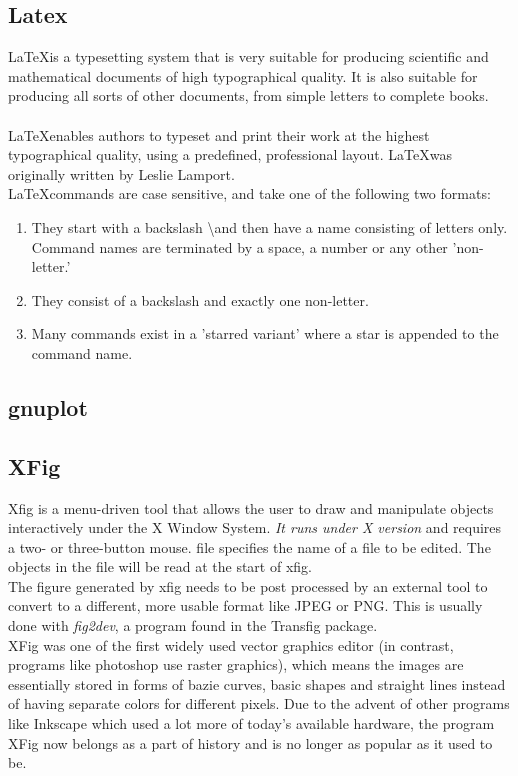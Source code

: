 \documentclass{beamer}
\begin{document}
\begin{frame}
	\section{Latex}
	\LaTeX is a typesetting system that is very suitable for producing scientific and mathematical documents of high typographical quality. It is also suitable for producing all sorts of other documents, from simple letters to complete books.\\
	\\
	\LaTeX enables authors to typeset and print their work at the highest typographical quality, using a predefined, professional layout. \LaTeX was originally written by Leslie Lamport.\\
	
	\LaTeX commands are case sensitive, and take one of the following two formats:
	\begin{enumerate}
		\item They start with a backslash \textbackslash and then have a name consisting of
		letters only. Command names are terminated by a space, a number or
		any other 'non-letter.'
		\item They consist of a backslash and exactly one non-letter.
		\item Many commands exist in a 'starred variant' where a star is appended
		to the command name.
	\end{enumerate}
\end{frame}
\begin{frame}
\section{gnuplot}
\end{frame}
\begin{frame}
\section{XFig}
Xfig  is a menu-driven tool that allows the user to draw and manipulate
objects interactively under the X Window System.  \emph{ It runs under X
version  } and requires a two- or three-button mouse.
file specifies the name of a file to be edited.   The  objects  in  the
file will be read at the start of xfig.
\\
The figure generated by xfig needs to be post processed by an external tool
to convert to a different, more usable format like JPEG or PNG. This is
usually done with \emph{fig2dev}, a program found in the Transfig package.
\\
XFig was one of the first widely used vector graphics editor (in contrast,
programs like photoshop use raster graphics), which means the images are
essentially stored in forms of bazie curves, basic shapes and straight lines
instead of having separate colors for different pixels. Due to the advent
of other programs like Inkscape which used a lot more of today's available
hardware, the program XFig now belongs as a part of history and is no longer
as popular as it used to be.
\end{frame}
\end{document}
